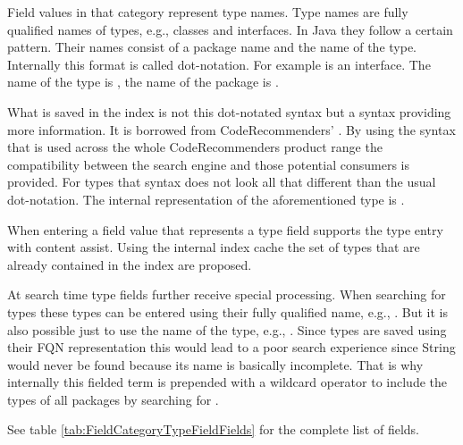 Field values in that category represent type names. 
Type names are fully qualified names of types, e.g., classes and interfaces. 
In Java they follow a certain pattern. Their names consist of a package name and the name of the type. 
Internally this format is called dot-notation. For example  is an interface. 
The name of the type is , the name of the package is .

What is saved in the index is not this dot-notated syntax but a syntax providing more information. It is borrowed from CodeRecommenders' . 
By using the syntax that is used across the whole CodeRecommenders product range the compatibility between the search engine and those potential consumers is provided. 
For types that syntax does not look all that different than the usual dot-notation. The internal representation of the aforementioned type  is .

When entering a field value that represents a type field \cname supports the type entry with content assist. 
Using the internal index cache the set of types that are already contained in the index are proposed.

At search time type fields further receive special processing. When searching for types these types can be entered using their fully qualified name, e.g., .
But it is also possible just to use the name of the type, e.g., . 
Since types are saved using their FQN representation this would lead to a poor search experience since String would never be found because its name is basically incomplete. 
That is why internally this fielded term is prepended with a wildcard operator to include the types  of all packages by searching for .

See table \ref{tab:FieldCategoryTypeFieldFields} for the complete list of fields.


